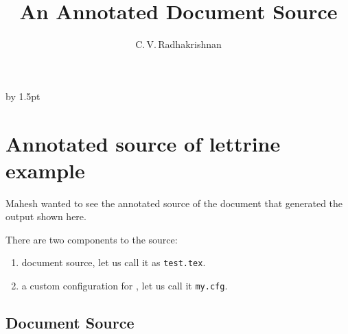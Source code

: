 \documentclass[a4paper]{article}
\begin{document}
\title{An Annotated Document Source}
\author{C.\,V.\,Radhakrishnan}
\maketitle
\advance\baselineskip by 1.5pt
\else
\section{Annotated source of lettrine example}
\fi

\noindent
Mahesh wanted to see the annotated source of the \tex document that
generated the output
{shown here}. 

There are two components to the source:
\begin{enumerate}
\item document source, let us call it as \verb'test.tex'.
\item a custom configuration for \texht, let us call it \verb'my.cfg'.

\end{enumerate}

\subsection*{Document Source}
\end{document}
